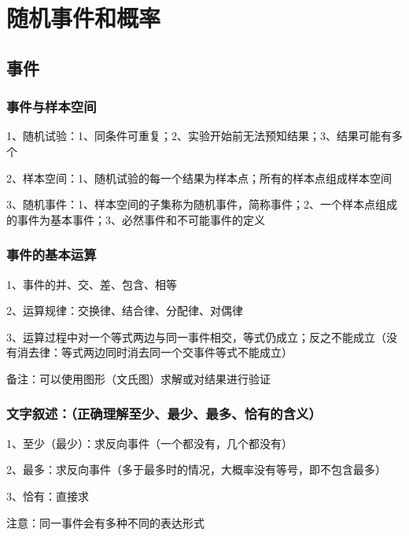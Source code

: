 \chapter{随机事件和概率}

\section{事件}



\subsection{事件与样本空间}

1、随机试验：1、同条件可重复；2、实验开始前无法预知结果；3、结果可能有多个

2、样本空间：1、随机试验的每一个结果为样本点；所有的样本点组成样本空间

3、随机事件：1、样本空间的子集称为随机事件，简称事件；2、一个样本点组成的事件为基本事件；3、必然事件和不可能事件的定义



\subsection{事件的基本运算}

1、事件的并、交、差、包含、相等

2、运算规律：交换律、结合律、分配律、对偶律

3、运算过程中对一个等式两边与同一事件相交，等式仍成立；反之不能成立（没有消去律：等式两边同时消去同一个交事件等式不能成立）

备注：可以使用图形（文氏图）求解或对结果进行验证



\subsection{文字叙述：（正确理解至少、最少、最多、恰有的含义）}

1、至少（最少）：求反向事件（一个都没有，几个都没有）

2、最多：求反向事件（多于最多时的情况，大概率没有等号，即不包含最多）

3、恰有：直接求

注意：同一事件会有多种不同的表达形式



